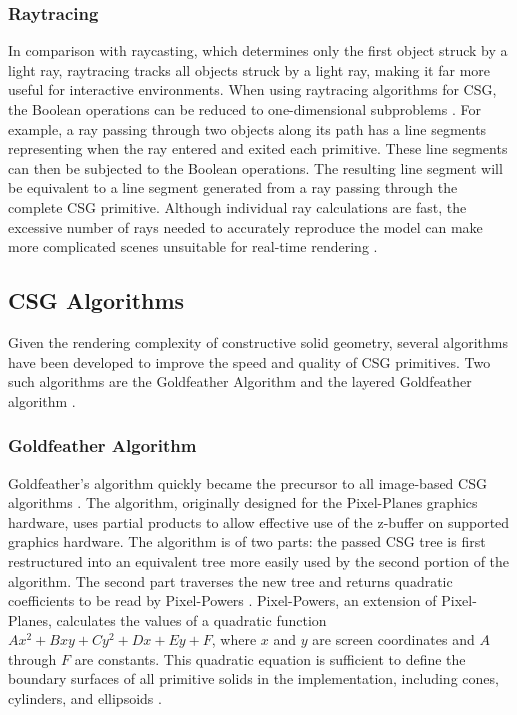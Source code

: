 \documentclass[12pt]{article}
\begin{document}
\begin{doublespace}
\subsubsection{Raytracing}
In comparison with raycasting, which determines only the first object struck by a light ray, raytracing tracks all objects struck by a light ray, making it far more useful for interactive environments. When using raytracing algorithms for CSG, the Boolean operations can be reduced to one-dimensional subproblems \cite{raytrace}. For example, a ray passing through two objects along its path has a line segments representing when the ray entered and exited each primitive. These line segments can then be subjected to the Boolean operations. The resulting line segment will be equivalent to a line segment generated from a ray passing through the complete CSG primitive. Although individual ray calculations are fast, the excessive number of rays needed to accurately reproduce the model can make more complicated scenes unsuitable for real-time rendering \cite{interactive_csg}.
\subsection{CSG Algorithms}
Given the rendering complexity of constructive solid geometry, several algorithms have been developed to improve the speed and quality of CSG primitives. Two such algorithms are the Goldfeather Algorithm \cite{gold} and the layered Goldfeather algorithm \cite{layered_gold}.
\subsubsection{Goldfeather Algorithm}
Goldfeather's algorithm quickly became the precursor to all image-based CSG algorithms \cite{hardware_csg}. The algorithm, originally designed for the Pixel-Planes graphics hardware, uses partial products to allow effective use of the z-buffer on supported graphics hardware. The algorithm is of two parts: the passed CSG tree is first restructured into an equivalent tree more easily used by the second portion of the algorithm. The second part traverses the new tree and returns quadratic coefficients to be read by Pixel-Powers \cite{gold}. Pixel-Powers, an extension of Pixel-Planes, calculates the values of a quadratic function $Ax^2 + Bxy + Cy^2 + Dx + Ey + F$, where $x$ and $y$ are screen coordinates and $A$ through $F$ are constants. This quadratic equation is sufficient to define the boundary surfaces of all primitive solids in the implementation, including cones, cylinders, and ellipsoids \cite{gold}.\\


\end{doublespace}
\end{document}
